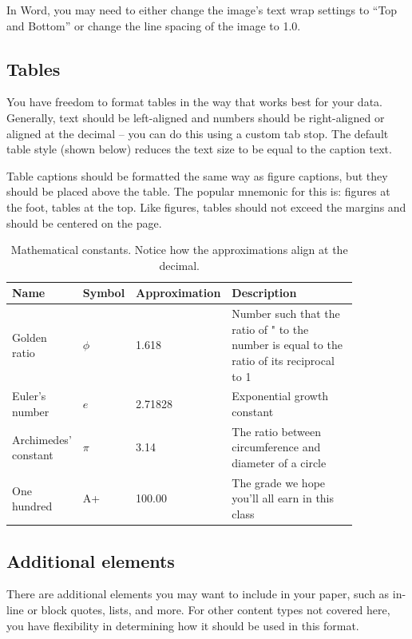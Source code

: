 \documentclass[
	letterpaper, %
]{jdf}
\begin{document}
In Word, you may need to either change the image’s text wrap settings to “Top and Bottom” or change the line spacing of the image to 1.0.

\subsection{Tables}
You have freedom to format tables in the way that works best for your data. Generally, text should be left-aligned and numbers should be right-aligned or aligned at the decimal – you can do this using a custom tab stop. The default table style (shown below) reduces the text size to be equal to the caption text.

Table captions should be formatted the same way as figure captions, but they should be placed above the table. The popular mnemonic for this is: figures at the foot, tables at the top. Like figures, tables should not exceed the margins and should be centered on the page.

\begin{table}[h] %
	\caption{Mathematical constants. Notice how the approximations align at the decimal.}
	\small %
	\centering %
	\begin{tabular}{L{0.17\linewidth} C{0.12\linewidth} L{0.17\linewidth} L{0.4\linewidth}}
		\textbf{Name} & \textbf{Symbol} & \textbf{Approximation} & \textbf{Description} \\
		\toprule[0.5pt]
		Golden ratio & $\phi$ & 1.618 & Number such that the ratio of " to the number is equal to the ratio of its reciprocal to 1\\
		\midrule
		Euler's number & $e$ & 2.71828 & Exponential growth constant\\
		\midrule
		Archimedes' constant & $\pi$ & 3.14 & The ratio between circumference and diameter of a circle\\
		\midrule
		One hundred & A+ & 100.00 & The grade we hope you’ll all earn in this class\\
	\end{tabular}
\end{table}

\subsection{Additional elements}
There are additional elements you may want to include in your paper, such as in-line or block quotes, lists, and more. For other content types not covered here, you have flexibility in determining how it should be used in this format.
\end{document}
